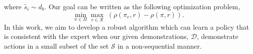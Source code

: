 \documentclass[11pt]{uai2023}
\newcommand{\mm}[1]{\textcolor{blue}{[#1]}}
\begin{document}





where $\tilde{s_i} \sim d_b$. Our goal can be written as the following optimization problem,
\begin{equation} \label{eq:IRL_formulation}
	\min_{\pi \in \Pi} \max_{r \in \mathcal{R}} \; (\rho(\pi_e, r) - \rho(\pi, r)).
\end{equation}
In this work, we aim to develop a robust algorithm which can learn a policy that is
consistent with the expert when our given demonstrations, $\mathcal{D}$, demonstrate actions in a small subset of the set $\mathcal{S}$ in a non-sequential manner.
\end{document}
